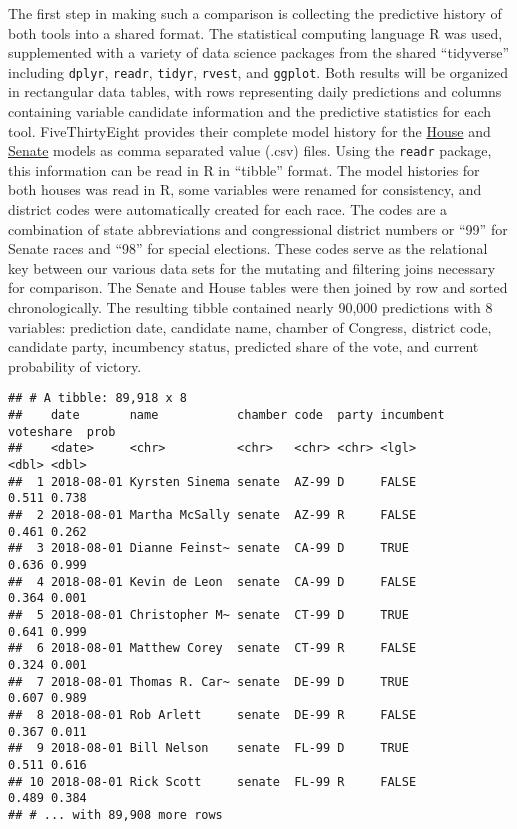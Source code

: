 \documentclass[]{article}
\begin{document}
The first step in making such a comparison is collecting the predictive
history of both tools into a shared format. The statistical computing
language R was used, supplemented with a variety of data science
packages from the shared ``tidyverse'' including \texttt{dplyr},
\texttt{readr}, \texttt{tidyr}, \texttt{rvest}, and \texttt{ggplot}.
Both results will be organized in rectangular data tables, with rows
representing daily predictions and columns containing variable candidate
information and the predictive statistics for each tool. FiveThirtyEight
provides their complete model history for the
\href{https://projects.fivethirtyeight.com/congress-model-2018/house_district_forecast.csv}{House}
and
\href{https://projects.fivethirtyeight.com/congress-model-2018/senate_seat_forecast.csv}{Senate}
models as comma separated value (.csv) files. Using the \texttt{readr}
package, this information can be read in R in ``tibble'' format. The
model histories for both houses was read in R, some variables were
renamed for consistency, and district codes were automatically created
for each race. The codes are a combination of state abbreviations and
congressional district numbers or ``99'' for Senate races and ``98'' for
special elections. These codes serve as the relational key between our
various data sets for the mutating and filtering joins necessary for
comparison. The Senate and House tables were then joined by row and
sorted chronologically. The resulting tibble contained nearly 90,000
predictions with 8 variables: prediction date, candidate name, chamber
of Congress, district code, candidate party, incumbency status,
predicted share of the vote, and current probability of victory.

\begin{verbatim}
## # A tibble: 89,918 x 8
##    date       name           chamber code  party incumbent voteshare  prob
##    <date>     <chr>          <chr>   <chr> <chr> <lgl>         <dbl> <dbl>
##  1 2018-08-01 Kyrsten Sinema senate  AZ-99 D     FALSE         0.511 0.738
##  2 2018-08-01 Martha McSally senate  AZ-99 R     FALSE         0.461 0.262
##  3 2018-08-01 Dianne Feinst~ senate  CA-99 D     TRUE          0.636 0.999
##  4 2018-08-01 Kevin de Leon  senate  CA-99 D     FALSE         0.364 0.001
##  5 2018-08-01 Christopher M~ senate  CT-99 D     TRUE          0.641 0.999
##  6 2018-08-01 Matthew Corey  senate  CT-99 R     FALSE         0.324 0.001
##  7 2018-08-01 Thomas R. Car~ senate  DE-99 D     TRUE          0.607 0.989
##  8 2018-08-01 Rob Arlett     senate  DE-99 R     FALSE         0.367 0.011
##  9 2018-08-01 Bill Nelson    senate  FL-99 D     TRUE          0.511 0.616
## 10 2018-08-01 Rick Scott     senate  FL-99 R     FALSE         0.489 0.384
## # ... with 89,908 more rows
\end{verbatim}
\end{document}
